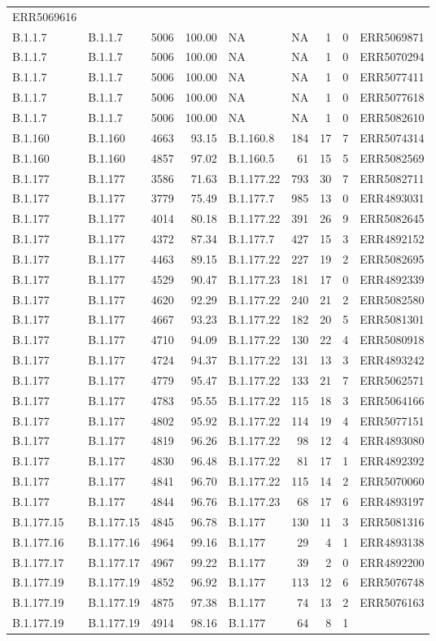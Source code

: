 \documentclass[
]{article}
\begin{document}
\begin{longtable}[]{@{}llrrlrrrl@{}}
ERR5069616\tabularnewline
B.1.1.7 & B.1.1.7 & 5006 & 100.00 & NA & NA & 1 & 0 &
ERR5069871\tabularnewline
B.1.1.7 & B.1.1.7 & 5006 & 100.00 & NA & NA & 1 & 0 &
ERR5070294\tabularnewline
B.1.1.7 & B.1.1.7 & 5006 & 100.00 & NA & NA & 1 & 0 &
ERR5077411\tabularnewline
B.1.1.7 & B.1.1.7 & 5006 & 100.00 & NA & NA & 1 & 0 &
ERR5077618\tabularnewline
B.1.1.7 & B.1.1.7 & 5006 & 100.00 & NA & NA & 1 & 0 &
ERR5082610\tabularnewline
B.1.160 & B.1.160 & 4663 & 93.15 & B.1.160.8 & 184 & 17 & 7 &
ERR5074314\tabularnewline
B.1.160 & B.1.160 & 4857 & 97.02 & B.1.160.5 & 61 & 15 & 5 &
ERR5082569\tabularnewline
B.1.177 & B.1.177 & 3586 & 71.63 & B.1.177.22 & 793 & 30 & 7 &
ERR5082711\tabularnewline
B.1.177 & B.1.177 & 3779 & 75.49 & B.1.177.7 & 985 & 13 & 0 &
ERR4893031\tabularnewline
B.1.177 & B.1.177 & 4014 & 80.18 & B.1.177.22 & 391 & 26 & 9 &
ERR5082645\tabularnewline
B.1.177 & B.1.177 & 4372 & 87.34 & B.1.177.7 & 427 & 15 & 3 &
ERR4892152\tabularnewline
B.1.177 & B.1.177 & 4463 & 89.15 & B.1.177.22 & 227 & 19 & 2 &
ERR5082695\tabularnewline
B.1.177 & B.1.177 & 4529 & 90.47 & B.1.177.23 & 181 & 17 & 0 &
ERR4892339\tabularnewline
B.1.177 & B.1.177 & 4620 & 92.29 & B.1.177.22 & 240 & 21 & 2 &
ERR5082580\tabularnewline
B.1.177 & B.1.177 & 4667 & 93.23 & B.1.177.22 & 182 & 20 & 5 &
ERR5081301\tabularnewline
B.1.177 & B.1.177 & 4710 & 94.09 & B.1.177.22 & 130 & 22 & 4 &
ERR5080918\tabularnewline
B.1.177 & B.1.177 & 4724 & 94.37 & B.1.177.22 & 131 & 13 & 3 &
ERR4893242\tabularnewline
B.1.177 & B.1.177 & 4779 & 95.47 & B.1.177.22 & 133 & 21 & 7 &
ERR5062571\tabularnewline
B.1.177 & B.1.177 & 4783 & 95.55 & B.1.177.22 & 115 & 18 & 3 &
ERR5064166\tabularnewline
B.1.177 & B.1.177 & 4802 & 95.92 & B.1.177.22 & 114 & 19 & 4 &
ERR5077151\tabularnewline
B.1.177 & B.1.177 & 4819 & 96.26 & B.1.177.22 & 98 & 12 & 4 &
ERR4893080\tabularnewline
B.1.177 & B.1.177 & 4830 & 96.48 & B.1.177.22 & 81 & 17 & 1 &
ERR4892392\tabularnewline
B.1.177 & B.1.177 & 4841 & 96.70 & B.1.177.22 & 115 & 14 & 2 &
ERR5070060\tabularnewline
B.1.177 & B.1.177 & 4844 & 96.76 & B.1.177.23 & 68 & 17 & 6 &
ERR4893197\tabularnewline
B.1.177.15 & B.1.177.15 & 4845 & 96.78 & B.1.177 & 130 & 11 & 3 &
ERR5081316\tabularnewline
B.1.177.16 & B.1.177.16 & 4964 & 99.16 & B.1.177 & 29 & 4 & 1 &
ERR4893138\tabularnewline
B.1.177.17 & B.1.177.17 & 4967 & 99.22 & B.1.177 & 39 & 2 & 0 &
ERR4892200\tabularnewline
B.1.177.19 & B.1.177.19 & 4852 & 96.92 & B.1.177 & 113 & 12 & 6 &
ERR5076748\tabularnewline
B.1.177.19 & B.1.177.19 & 4875 & 97.38 & B.1.177 & 74 & 13 & 2 &
ERR5076163\tabularnewline
B.1.177.19 & B.1.177.19 & 4914 & 98.16 & B.1.177 & 64 & 8 & 1 &

\end{longtable}
\end{document}
